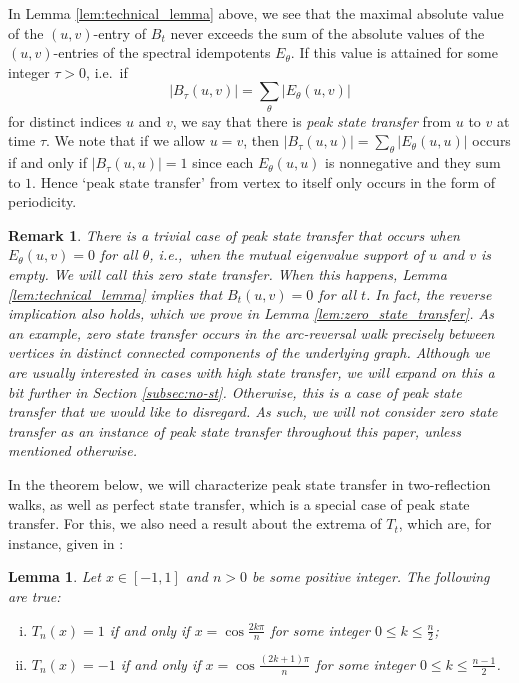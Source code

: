 \documentclass{article}
\newtheorem{lemma}[theorem]{Lemma}
\newtheorem{remark}[theorem]{Remark}
\numberwithin{equation}{section}
\begin{document}
In Lemma \ref{lem:technical_lemma} above, we see that the maximal absolute value of the $(u,v)$-entry of $B_t$ never exceeds the sum of the absolute values of the $(u,v)$-entries of the spectral idempotents $E_\theta$. If this value is attained for some integer $\tau > 0$, i.e.\ if 
\[
|B_\tau(u,v)| = \sum_{\theta} |E_\theta(u,v)|
\]
for distinct indices $u $ and $ v$, we say that there is \textsl{peak state transfer} from $u$ to $v$ at time $\tau$. We note that if we allow $u=v$, then $|B_\tau(u,u)| = \sum_\theta |E_\theta(u,u)|$ occurs if and only if $|B_\tau(u,u)| =1$ since each $E_\theta(u,u)$ is nonnegative and they sum to $1$. Hence `peak state transfer' from vertex to itself only occurs in the form of periodicity.

\begin{remark}
\label{rem:lambda_empty}
    There is a trivial case of peak state transfer that occurs when $E_\theta(u,v) = 0$ for all $\theta$, i.e.,\ when the mutual eigenvalue support of $u$ and $v$ is empty. We will call this \textsl{zero state transfer}. When this happens, Lemma \ref{lem:technical_lemma} implies that $B_t(u,v) = 0$ for all $t$. In fact, the reverse implication also holds, which we prove in Lemma \ref{lem:zero_state_transfer}. As an example, zero state transfer occurs in the arc-reversal walk precisely between vertices in distinct connected components of the underlying graph. Although we are usually interested in cases with high state transfer, we will expand on this a bit further in Section \ref{subsec:no-st}. Otherwise, this is a case of peak state transfer that we would like to disregard. As such, we will not consider zero state transfer as an instance of peak state transfer throughout this paper, unless mentioned otherwise.
\end{remark}

In the theorem below, we will characterize peak state transfer in two-reflection walks, as well as perfect state transfer, which is a special case of peak state transfer. For this, we also need a result about the extrema of $T_t$, which are, for instance, given in \cite{Riv1974}:
\begin{lemma}
\label{lem:Chebyshev_extrema}
Let $x \in [-1,1]$ and $n > 0$ be some positive integer. The following are true:
\begin{enumerate}[(i)]
\item $T_n(x) = 1$ if and only if $x  = \cos  \frac{2k\pi}{n}$ for  some integer $0 \leq k \leq \frac{n}{2}$;
\item $T_n(x) = -1$ if and only if $x  = \cos \frac{(2k + 1)\pi }{n} $ for some integer $0 \leq k \leq \frac{n-1}{2}$.
\end{enumerate}
\end{lemma}
\end{document}
